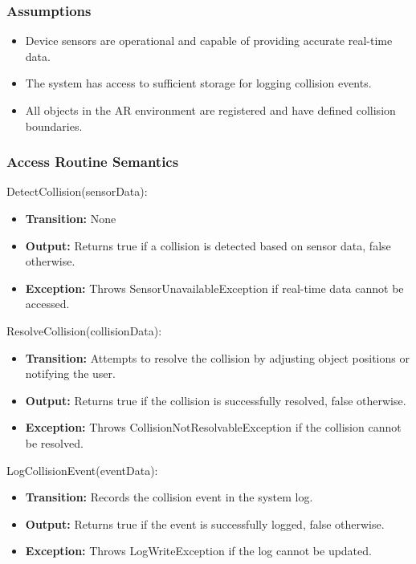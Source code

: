 \documentclass[12pt, titlepage]{article}
\begin{document}
\subsubsection{Assumptions}

\begin{itemize}
  \item Device sensors are operational and capable of providing accurate real-time data.
  \item The system has access to sufficient storage for logging collision events.
  \item All objects in the AR environment are registered and have defined collision boundaries.
\end{itemize}

\subsubsection{Access Routine Semantics}

\noindent DetectCollision(sensorData):
\begin{itemize}
  \item \textbf{Transition:} None
  \item \textbf{Output:} Returns true if a collision is detected based on sensor data, false otherwise.
  \item \textbf{Exception:} Throws SensorUnavailableException if real-time data cannot be accessed.
\end{itemize}

\noindent ResolveCollision(collisionData):
\begin{itemize}
  \item \textbf{Transition:} Attempts to resolve the collision by adjusting object positions or notifying the user.
  \item \textbf{Output:} Returns true if the collision is successfully resolved, false otherwise.
  \item \textbf{Exception:} Throws CollisionNotResolvableException if the collision cannot be resolved.
\end{itemize}

\noindent LogCollisionEvent(eventData):
\begin{itemize}
  \item \textbf{Transition:} Records the collision event in the system log.
  \item \textbf{Output:} Returns true if the event is successfully logged, false otherwise.
  \item \textbf{Exception:} Throws LogWriteException if the log cannot be updated.
\end{itemize}
\end{document}
